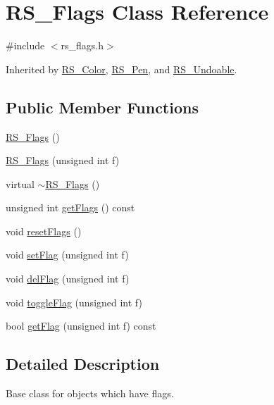 \hypertarget{class_r_s___flags}{\section{R\-S\-\_\-\-Flags Class Reference}
\label{class_r_s___flags}
}


{\ttfamily \#include $<$rs\-\_\-flags.\-h$>$}



Inherited by \hyperlink{class_r_s___color}{R\-S\-\_\-\-Color}, \hyperlink{class_r_s___pen}{R\-S\-\_\-\-Pen}, and \hyperlink{class_r_s___undoable}{R\-S\-\_\-\-Undoable}.

\subsection*{Public Member Functions}
\begin{DoxyCompactItemize}
\item 
\hyperlink{class_r_s___flags_af861f02a5edbed5cd68058452178bf04}{R\-S\-\_\-\-Flags} ()
\item 
\hyperlink{class_r_s___flags_af07f858ba2091d9e295cc97e965c1043}{R\-S\-\_\-\-Flags} (unsigned int f)
\item 
virtual \hyperlink{class_r_s___flags_af4a3ddd37192ddfdde3022318044099c}{$\sim$\-R\-S\-\_\-\-Flags} ()
\item 
unsigned int \hyperlink{class_r_s___flags_acd7f6dc8ec453376cc308719271bd469}{get\-Flags} () const 
\item 
void \hyperlink{class_r_s___flags_aac8e49396dd71bea8df1481c318eee57}{reset\-Flags} ()
\item 
void \hyperlink{class_r_s___flags_a66aa2effd1ca0ec04b3a16f8576ecd94}{set\-Flag} (unsigned int f)
\item 
void \hyperlink{class_r_s___flags_a19f86d1463edf612c1de67d78f77417d}{del\-Flag} (unsigned int f)
\item 
void \hyperlink{class_r_s___flags_ac6df5a739d040a9bdab0cf3477737275}{toggle\-Flag} (unsigned int f)
\item 
bool \hyperlink{class_r_s___flags_aa30480dd06a533ee0a384a16f822da30}{get\-Flag} (unsigned int f) const 
\end{DoxyCompactItemize}


\subsection{Detailed Description}
Base class for objects which have flags. 

